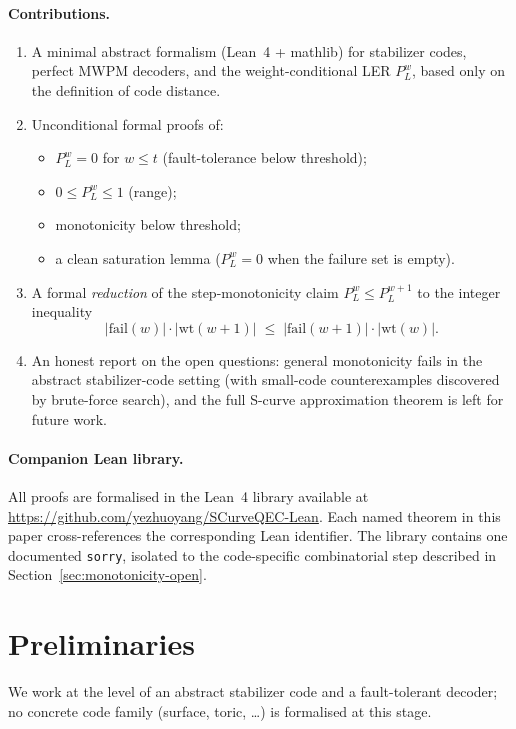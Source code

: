 \documentclass[11pt]{article}
\theoremstyle{definition}
\theoremstyle{remark}
\begin{document}
\paragraph{Contributions.}
\begin{enumerate}
\item A minimal abstract formalism (Lean~4 + mathlib) for
stabilizer codes, perfect MWPM decoders, and the weight-conditional
LER $P_L^w$, based only on the definition of code distance.
\item Unconditional formal proofs of:
\begin{itemize}
\item $P_L^w = 0$ for $w \leq t$ (fault-tolerance below threshold);
\item $0 \leq P_L^w \leq 1$ (range);
\item monotonicity below threshold;
\item a clean saturation lemma ($P_L^w = 0$ when the failure set
    is empty).
\end{itemize}
\item A formal \emph{reduction} of the step-monotonicity claim
$P_L^{w} \leq P_L^{w+1}$ to the integer inequality
$$|\mathrm{fail}(w)| \cdot |\mathrm{wt}(w+1)|
\;\leq\; |\mathrm{fail}(w+1)| \cdot |\mathrm{wt}(w)|.$$
\item An honest report on the open questions: general monotonicity
fails in the abstract stabilizer-code setting (with small-code
counterexamples discovered by brute-force search), and the full
S-curve approximation theorem is left for future work.
\end{enumerate}

\paragraph{Companion Lean library.}
All proofs are formalised in the Lean~4 library available at
\url{https://github.com/yezhuoyang/SCurveQEC-Lean}.
Each named theorem in this paper cross-references the
corresponding Lean identifier.  The library contains one
documented \texttt{sorry}, isolated to the code-specific
combinatorial step described in
Section~\ref{sec:monotonicity-open}.

\section{Preliminaries}

We work at the level of an abstract stabilizer code and a
fault-tolerant decoder; no concrete code family (surface, toric,
\ldots) is formalised at this stage.
\end{document}
